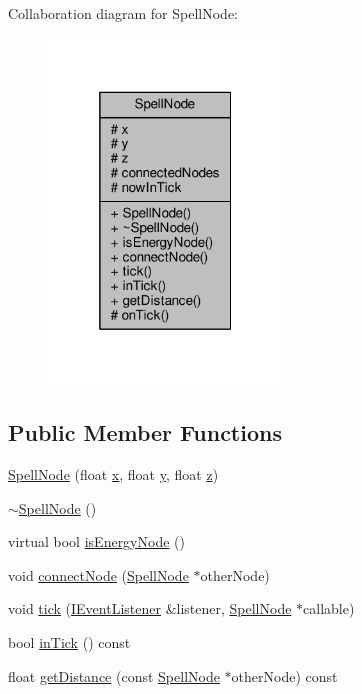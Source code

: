 Collaboration diagram for Spell\-Node\-:
\nopagebreak
\begin{figure}[H]
\begin{center}
\leavevmode
\includegraphics[width=176pt]{class_spell_node__coll__graph}
\end{center}
\end{figure}
\subsection*{Public Member Functions}
\begin{DoxyCompactItemize}
\item 
\hyperlink{class_spell_node_a494db54e25007a0a5a0f0fb69e4e0edf}{Spell\-Node} (float \hyperlink{class_spell_node_a916f2a709a674dd2a61530b6acc339cc}{x}, float \hyperlink{class_spell_node_a754d80fd0fd82dbc12443b5f277b9fb4}{y}, float \hyperlink{class_spell_node_aff090331ff1bd816a22e974a50c1a180}{z})
\item 
\hyperlink{class_spell_node_a30bca8b90baeb81361db17ed3f712f7a}{$\sim$\-Spell\-Node} ()
\item 
virtual bool \hyperlink{class_spell_node_aa697b780e010dea8deb78eae8f61e36f}{is\-Energy\-Node} ()
\item 
void \hyperlink{class_spell_node_a66ea41a0a12d0dd8a2ac4eb0c5b1e046}{connect\-Node} (\hyperlink{class_spell_node}{Spell\-Node} $\ast$other\-Node)
\item 
void \hyperlink{class_spell_node_a1286f427e4386e3524ce6914b22a94fb}{tick} (\hyperlink{class_i_event_listener}{I\-Event\-Listener} \&listener, \hyperlink{class_spell_node}{Spell\-Node} $\ast$callable)
\item 
bool \hyperlink{class_spell_node_a711b368a0e285c644737c6f53f641a6f}{in\-Tick} () const 
\item 
float \hyperlink{class_spell_node_ad5fb7d9576d5ea948cbb0451387df7aa}{get\-Distance} (const \hyperlink{class_spell_node}{Spell\-Node} $\ast$other\-Node) const 
\end{DoxyCompactItemize}
